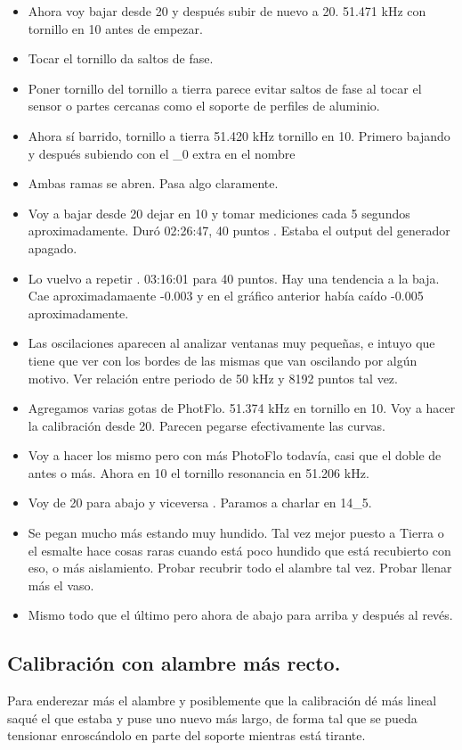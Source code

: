 \begin{itemize}
	\item Ahora voy bajar desde 20 y después subir de nuevo a 20. 51.471 kHz con tornillo en 10 antes de empezar. 
	\item Tocar el tornillo da saltos de fase. 
	\item Poner tornillo del tornillo a tierra parece evitar saltos de fase al tocar el sensor o partes cercanas como el soporte de perfiles de aluminio. 
	\item Ahora sí barrido, tornillo a tierra 51.420 kHz tornillo en 10. Primero bajando y después subiendo con el \_0 extra en el nombre \item Ambas ramas se abren. Pasa algo claramente. 
	
	
	\item Voy a bajar desde 20 dejar en 10 y tomar mediciones cada 5 segundos aproximadamente. Duró 02:26:47, 40 puntos . Estaba el output del generador apagado. 
	\item Lo vuelvo a repetir . 03:16:01 para 40 puntos. Hay una tendencia a la baja. Cae aproximadamaente -0.003 y en el gráfico anterior había caído -0.005 aproximadamente. 
	\item Las oscilaciones aparecen al analizar ventanas muy pequeñas, e intuyo que tiene que ver con los bordes de las mismas que van oscilando por algún motivo. Ver relación entre periodo de 50 kHz y 8192 puntos tal vez. 
	
	\item Agregamos varias gotas de PhotFlo. 51.374 kHz en tornillo en 10. Voy a hacer la calibración desde 20. Parecen pegarse efectivamente las curvas. 
	
	\item Voy a hacer los mismo pero con más PhotoFlo todavía, casi que el doble de antes o más. Ahora en 10 el tornillo resonancia en 51.206 kHz. 
	\item Voy de 20 para abajo y viceversa . Paramos a charlar en 14\_5. 
	\item Se pegan mucho más estando muy hundido. Tal vez mejor puesto a Tierra o el esmalte hace cosas raras cuando está poco hundido que está recubierto con eso, o más aislamiento. Probar recubrir todo el alambre tal vez. Probar llenar más el vaso. 
	
	\item Mismo todo que el último pero ahora de abajo para arriba y después al revés. 
	
	
\end{itemize}

\subsection*{Calibración con alambre más recto.}
Para enderezar más el alambre y posiblemente que la calibración dé más lineal saqué el que estaba y puse uno nuevo más largo, de forma tal que se pueda tensionar enroscándolo en parte del soporte mientras está tirante. 

